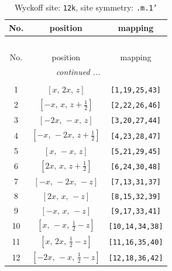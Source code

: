 \documentclass[fleqn,8pt]{jsarticle}
\begin{document}
\begin{longtable}{ccc}
\caption{Wyckoff site: {\tt 12k}, site symmetry: {\tt .m.1'}}
 \\
 \hline \hline
No. & position & mapping \\ \hline \endfirsthead

\multicolumn{2}{l}{\tablename\ \thetable{}} \\
 \hline \hline
No. & position & mapping \\ \hline \endhead

 \hline \hline
\multicolumn{2}{r}{\footnotesize\it continued ...} \\ \endfoot

 \hline \hline
\multicolumn{2}{r}{} \\ \endlastfoot

1 & $\left[ x,\, 2 x,\, z \right]$ & {\tt [1,19,25,43]} \\ \hline
2 & $\left[ - x,\, x,\, z + \frac{1}{2} \right]$ & {\tt [2,22,26,46]} \\ \hline
3 & $\left[ - 2 x,\, - x,\, z \right]$ & {\tt [3,20,27,44]} \\ \hline
4 & $\left[ - x,\, - 2 x,\, z + \frac{1}{2} \right]$ & {\tt [4,23,28,47]} \\ \hline
5 & $\left[ x,\, - x,\, z \right]$ & {\tt [5,21,29,45]} \\ \hline
6 & $\left[ 2 x,\, x,\, z + \frac{1}{2} \right]$ & {\tt [6,24,30,48]} \\ \hline
7 & $\left[ - x,\, - 2 x,\, - z \right]$ & {\tt [7,13,31,37]} \\ \hline
8 & $\left[ 2 x,\, x,\, - z \right]$ & {\tt [8,15,32,39]} \\ \hline
9 & $\left[ - x,\, x,\, - z \right]$ & {\tt [9,17,33,41]} \\ \hline
10 & $\left[ x,\, - x,\, \frac{1}{2} - z \right]$ & {\tt [10,14,34,38]} \\ \hline
11 & $\left[ x,\, 2 x,\, \frac{1}{2} - z \right]$ & {\tt [11,16,35,40]} \\ \hline
12 & $\left[ - 2 x,\, - x,\, \frac{1}{2} - z \right]$ & {\tt [12,18,36,42]} \\
\end{longtable}
\renewcommand{\arraystretch}{1.2}
\end{document}
